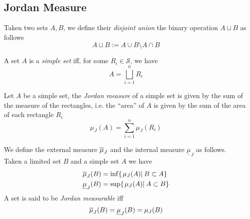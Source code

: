 \documentclass[../complete.tex]{subfiles}
\begin{document}
\subsection{Jordan Measure}
\begin{dfn}
	Taken two sets $A,B$, we define their \textit{disjoint union} the binary operation $A\sqcup B$ as follows
	\begin{equation}
		A\sqcup B:=A\cup B\setminus A\cap B
		\label{eq:disjointunion}
	\end{equation}
\end{dfn}
\begin{dfn}
	A set $A$ is a \textit{simple set} iff, for some $R_i\in\mathcal{S}$, we have
	\begin{equation*}
		A=\bigsqcup_{i=1}^nR_i
	\end{equation*}
\end{dfn}
\begin{dfn}
	Let $A$ be a simple set, the \textit{Jordan measure} of a simple set is given by the sum of the measure of the rectangles, i.e. the ``area'' of $A$ is given by the sum of the area of each rectangle $R_i$
	\begin{equation}
		\mu_J(A)=\sum_{i=1}^n\mu_J(R_i)
		\label{eq:simplesetmeas}
	\end{equation}
\end{dfn}
\begin{dfn}
	We define the external measure $\overline{\mu}_J$ and the internal measure $\underline{\mu}_J$ as follows.\\
	Taken a limited set $B$ and a simple set $A$ we have
	\begin{equation}
		\begin{aligned}
			\overline{\mu}_J(B)&=\inf\{\left.\mu_J(A)\right|_{}B\subset A\}\\
			\underline{\mu}_J(B)&=\sup\{\left.\mu_J(A)\right|_{}A\subset B\}
		\end{aligned}
		\label{eq:extintmeas}
	\end{equation}
	A set is said to be \textit{Jordan measurable} iff
	\begin{equation*}
		\overline{\mu}_J(B)=\underline{\mu}_J(B)=\mu_J(B)
	\end{equation*}
\end{dfn}
\end{document}

